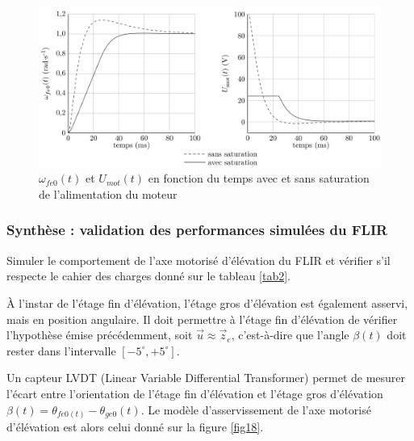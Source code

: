 \begin{figure}[!htb]
\begin{center}
\includegraphics[width=1.0\textwidth]{images/figure17.jpg}
\caption{$\omega_{fe0}(t)$ et $U_{mot}(t)$ en fonction du temps avec et sans saturation de l'alimentation du moteur\label{fig17}}
\end{center}
\end{figure}


\FloatBarrier
\subsubsection{Synthèse : validation des performances simulées du FLIR}

\begin{objectif}
Simuler le comportement de l'axe motorisé d'élévation du FLIR et vérifier s'il respecte le cahier des
charges donné sur le tableau \ref{tab2}.
\end{objectif}

À l'instar de l'étage fin d'élévation, l'étage gros d'élévation est également asservi, mais en position angulaire. Il
doit permettre à l'étage fin d'élévation de vérifier l'hypothèse émise précédemment, soit $\overrightarrow{u}\approx \overrightarrow{z}_e$, c'est-à-dire que l'angle $\beta(t)$ doit rester dans l'intervalle $\left[-5^{\circ}, +5^{\circ}\right]$.

Un capteur LVDT (Linear Variable Differential Transformer) permet de mesurer l'écart entre l'orientation de
l'étage fin d'élévation et l'étage gros d'élévation $\beta(t)=\theta_{fe0(t)}-\theta_{ge0}(t)$. Le modèle d'asservissement de l'axe
motorisé d'élévation est alors celui donné sur la figure \ref{fig18}.


